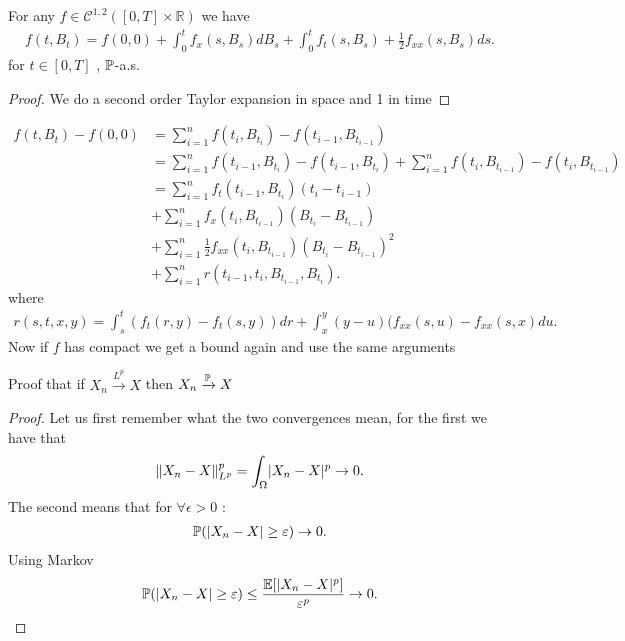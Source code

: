 \begin{Theorem}[3.21]
  For any $f \in  \mathcal{C}^{1,2}([0,T]\times \mathbb{R}) $  we have
  \begin{align*}
    f(t,B_t) = f(0,0) + \int_{0}^{t} f_x(s,B_s) dB_s + \int_0^{t} f_t(s,B_s) + \frac{1}{2} f_{x x}(s,B_s) ds    
  .\end{align*}
  for $t \in [0,T]$ , $\P$-a.s.
\end{Theorem}
\begin{proof}
 We do a second order Taylor expansion in space and 1 in time  
\end{proof}
\begin{align*}
  f(t,B_t) - f(0,0) &= \sum_{i=1}^{n} f(t_{i},B_{t_i}) - f(t_{i-1},B_{t_{i-1}})\\
                    &= \sum_{i=1}^{n} f(t_{i-1},B_{t_{i}})-f(t_{i-1},B_{t_i}) + \sum_{i=1}^{n} f(t_{i},B_{t_{i-1}}) - f(t_{i},B_{t_{i-1}})\\
                    &= \sum_{i=1}^{n} f_t(t_{i-1},B_{t_{i}})(t_i -t_{i-1}) \\
                    &+ \sum_{i=1}^{n} f_x(t_i,B_{t_{i-1}})(B_{t_i}-B_{t_{i-1}})\\
                    &+ \sum_{i=1}^{n} \frac{1}{2}f_{x x}(t_i,B_{t_{i-1}})(B_{t_i}-B_{t_{i-1}})^2\\
                    &+ \sum_{i=1}^{n} r(t_{i-1},t_i,B_{t_{i-1}},B_{t_i})
.\end{align*}
where 
\begin{align*}
  r(s,t,x,y) = \int_s^{t} (f_t(r,y)-f_{t}(s,y))  dr + \int_x^y (y-u)(f_{x x}(s,u) - f_{x x}(s,x) du
.\end{align*}
Now if $f$ has compact we get a bound again and use the same arguments
\begin{Lemma}
  Proof that if $X_n \xrightarrow{L^{p} } X$  then $X_n \xrightarrow{\P}  X$
\end{Lemma}
\begin{proof}
 Let us first remember what the two convergences mean, for the first we have that
 \begin{align*}
   \|X_n - X\|_{L^{p} }^{p}  = \int_{\Omega} \abs{X_n - X}^{p}  \to 0
 .\end{align*}
 The second means that for $\forall  \epsilon >0$ : 
 \begin{align*}
  \P(\abs{X_n-X} \ge \epsilon) \to  0
 .\end{align*}
 Using Markov 
 \begin{align*}
   \P(\abs{X_n-X} \ge \epsilon) \le \frac{\E[\abs{X_n-X}^p]}{\epsilon^p} \to 0
 .\end{align*}
\end{proof}
